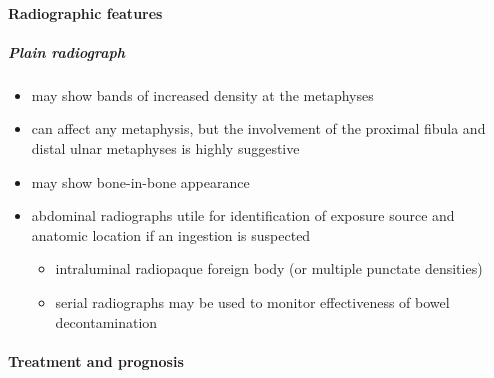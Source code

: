 \paragraph{Radiographic features}

\subparagraph{Plain radiograph}

\begin{itemize}
	\item
	may show bands of increased density at the metaphyses
	\item
	can affect any metaphysis, but the involvement of the proximal fibula and distal ulnar metaphyses is highly suggestive
	\item
	may show bone-in-bone appearance
	\item
	abdominal radiographs utile for identification of exposure source and anatomic location if an ingestion is suspected 
	
	\begin{itemize}
		\item
		intraluminal radiopaque foreign body (or multiple punctate densities)
		\item
		serial radiographs may be used to monitor effectiveness of bowel decontamination
	\end{itemize}
\end{itemize}

\paragraph{Treatment and prognosis}

